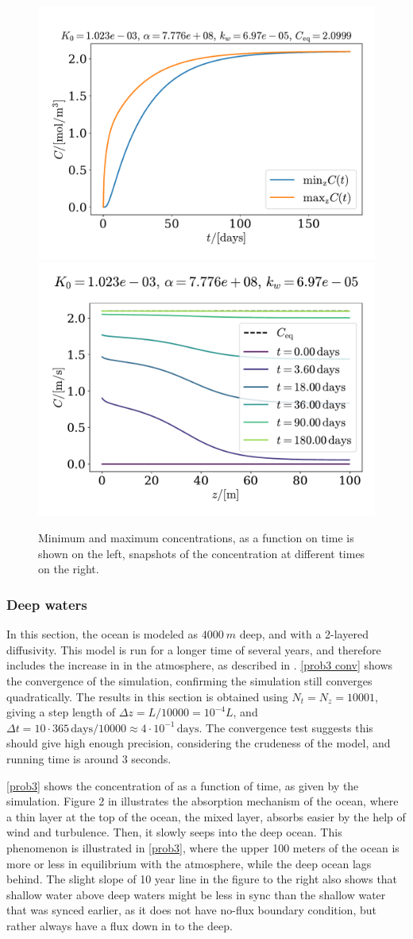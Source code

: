 \documentclass{article}
\begin{document}
    \begin{figure}[H]
        \centering
        \includegraphics[width=.49\textwidth]{../plots/prob2_minmax}
        \includegraphics[width=.49\textwidth]{../plots/prob2_i}
        \caption{Minimum and maximum concentrations, as a function on time is shown on the left, snapshots of the concentration at different times on the right.}
        \label{prob2 minmax}
    \end{figure}

    \subsubsection*{Deep waters}

    In this section, the ocean is modeled as $\SI{4000}{m}$ deep, and with a 2-layered diffusivity. This model is run for a longer time of several years, and therefore includes the increase in  in the atmosphere, as described in \cite{exercise}. \autoref{prob3 conv} shows the convergence of the simulation, confirming the simulation still converges quadratically. The results in this section is obtained using $N_t = N_z = 10 001$, giving a step length of $\Delta z = L / 10 000 = 10^{-4} L $, and $\Delta t = 10 \cdot 365 \, \mathrm{days} / 10 000 \approx 4 \cdot 10^{-1} \, \mathrm{days}$. The convergence test suggests this should give high enough precision, considering the crudeness of the model, and running time is around 3 seconds.

    \autoref{prob3} shows the concentration of  as a function of time, as given by the simulation. Figure 2 in \cite{exercise} illustrates the absorption mechanism of the ocean, where a thin layer at the top of the ocean, the mixed layer, absorbs  easier by the help of wind and turbulence. Then, it slowly seeps into the deep ocean. This phenomenon is illustrated in \autoref{prob3}, where the upper 100 meters of the ocean is more or less in equilibrium with the atmosphere, while the deep ocean lags behind. The slight slope of 10 year line in the figure to the right also shows that shallow water above deep waters might be less in sync than the shallow water that was synced earlier, as it does not have no-flux boundary condition, but rather always have a flux down in to the deep. 
    
\end{document}
